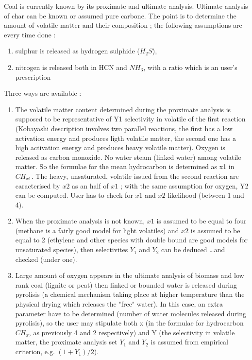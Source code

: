 Coal is currently known by its proximate and ultimate analysis. Ultimate analysis of char can be known or assumed pure carbone.
The point is to determine the amount of volatile matter and their composition ;
the following assumptions are every time done :
\begin{enumerate}
\item sulphur is released as hydrogen sulphide ($H_{2}S$),
\item nitrogen is released both in HCN and $NH_{3}$, with a ratio which is an user's prescription
\end{enumerate}

Three ways are available :
\begin{enumerate}

\item The volatile matter content determined during the proximate analysis is
  supposed to be representative of Y1 selectivity in volatile of the first
  reaction (Kobayashi description involves two parallel reactions, the first has
  a low activation energy and produces ligth volatile matter, the second one has
  a high activation energy and produces heavy volatile matter). Oxygen is
  released as carbon monoxide. No water steam (linked water) among volatile
  matter. So the formulae for the mean hydrocarbon is determined as x1 in
  $CH_{x1}$. The heavy, unsaturated, volatile issued from the second reaction
  are caracterised by $x2$ as an half of $x1$ ; with the same assumption for
  oxygen, Y2 can be computed. User has to check for $x1$ and $x2$ likelihood
  (between 1 and 4).
\item When the proximate analysis is not known, $x1$ is assumed to be equal to
  four (methane is a fairly good model for light volatiles) and $x2$ is assumed
  to be equal to 2 (ethylene and other species with double bound are good models
  for unsaturated species), then selectivites $Y_1$ and $Y_2$ can be deduced
  \ldots and checked (under one).
\item Large amount of oxygen appears in the ultimate analysis of biomass and low
  rank coal (lignite or peat) then linked or bounded water is released during
  pyrolisis (a chemical mechanism taking place at higher temperature than the
  physical drying which releases the "free" water). In this case, an extra
  parameter have to be determined (number of water molecules released during
  pyrolisis), so the user may stipulate both x (in the formulae for hydrocarbon
  $CH_{x}$, as previously 4 and 2 respectively) and Y (the selectivity in
  volatile matter, the proximate analysis set $Y_1$ and $Y_2$ is assumed from
  empirical criterion, e.g. $(1+Y_1)/2$).

\end{enumerate}

